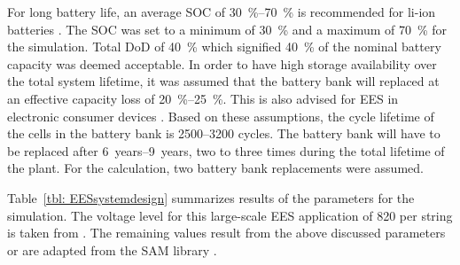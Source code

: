 For long battery life, an average SOC of \SIrange{30}{70}{\percent} is recommended for li-ion batteries \cite{Jossen2006}. The SOC was set to a minimum of \SI{30}{\percent} and a maximum of \SI{70}{\percent} for the simulation. Total DoD of \SI{40}{\percent} which signified \SI{40}{\percent} of the nominal battery capacity was deemed acceptable. In order to have high storage availability over the total system lifetime, it was assumed that the battery bank will replaced at an effective capacity loss of \SIrange{20}{25}{\percent}. This is also advised for EES in electronic consumer devices \cite{Spotnitz2003}. Based on these assumptions, the cycle lifetime of the cells in the battery bank is \numrange{2500}{3200} cycles. The battery bank will have to be replaced after \SIrange{6}{9}{years}, two to three times during the total lifetime of the plant. For the calculation, two battery bank replacements were assumed. 


Table~\ref{tbl: EESsystemdesign} summarizes results of the parameters for the simulation. The voltage level for this large-scale EES application of \SI{820}{\voltsdc} per string is taken from \cite{Leuthold2014}. The remaining values result from the above discussed parameters or are adapted from the SAM library \cite{Diorio2015}.

